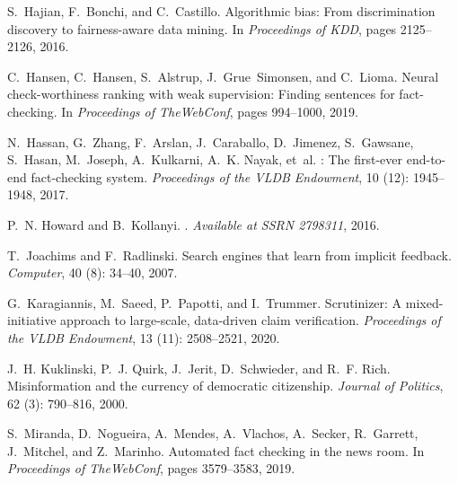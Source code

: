 \documentclass[11pt]{article}
\begin{document}
\begin{thebibliography}{10}
\begin{small}
S.~Hajian, F.~Bonchi, and C.~Castillo.
\newblock Algorithmic bias: From discrimination discovery to fairness-aware
data mining.
\newblock In \emph{Proceedings of KDD}, pages 2125--2126, 2016.

C.~Hansen, C.~Hansen, S.~Alstrup, J.~Grue~Simonsen, and C.~Lioma.
\newblock Neural check-worthiness ranking with weak supervision: Finding
sentences for fact-checking.
\newblock In \emph{Proceedings of TheWebConf}, pages 994--1000, 2019.

N.~Hassan, G.~Zhang, F.~Arslan, J.~Caraballo, D.~Jimenez, S.~Gawsane, S.~Hasan,
M.~Joseph, A.~Kulkarni, A.~K. Nayak, et~al.
: The first-ever end-to-end fact-checking system.
\newblock \emph{Proceedings of the VLDB Endowment}, 10 (12):
1945--1948, 2017.

P.~N. Howard and B.~Kollanyi.
.
\newblock \emph{Available at SSRN 2798311}, 2016.

T.~Joachims and F.~Radlinski.
\newblock Search engines that learn from implicit feedback.
\newblock \emph{Computer}, 40 (8): 34--40, 2007.

G.~Karagiannis, M.~Saeed, P.~Papotti, and I.~Trummer.
\newblock Scrutinizer: A mixed-initiative approach to large-scale, data-driven
claim verification.
\newblock \emph{Proceedings of the VLDB Endowment}, 13 (11):
2508--2521, 2020.

J.~H. Kuklinski, P.~J. Quirk, J.~Jerit, D.~Schwieder, and R.~F. Rich.
\newblock Misinformation and the currency of democratic citizenship.
\newblock \emph{Journal of Politics}, 62 (3): 790--816, 2000.

S.~Miranda, D.~Nogueira, A.~Mendes, A.~Vlachos, A.~Secker, R.~Garrett,
J.~Mitchel, and Z.~Marinho.
\newblock Automated fact checking in the news room.
\newblock In \emph{Proceedings of TheWebConf}, pages 3579--3583, 2019.


\end{small}
\end{thebibliography}
\end{document}
